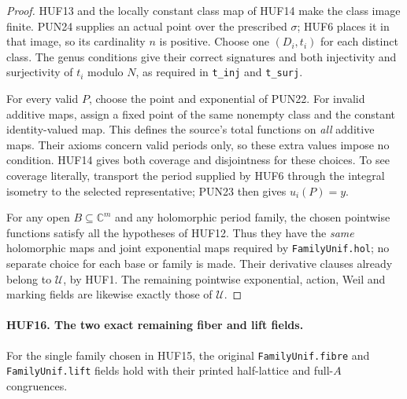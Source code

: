 \begin{proof}
HUF13 and the locally constant class map of HUF14
make the class image finite.  PUN24 supplies an
actual point over the prescribed \(\sigma\);
HUF6 places it in that image, so its cardinality
\(n\) is positive.
Choose one \((D_i,t_i)\) for each distinct class.
The genus conditions give their correct signatures
and both injectivity and surjectivity of \(t_i\)
modulo \(N\), as required in \texttt{t\_inj}
and \texttt{t\_surj}.

For every valid \(P\), choose the point and
exponential of PUN22.  For invalid additive maps,
assign a fixed point of the same nonempty class
and the constant identity-valued map.
This defines the source's total functions on
\emph{all} additive maps.  Their axioms concern
valid periods only, so these extra values impose
no condition.  HUF14 gives both coverage and
disjointness for these choices.  To see coverage
literally, transport the period supplied by HUF6
through the integral isometry to the selected
representative; PUN23 then gives \(u_i(P)=y\).

For any open \(B\subseteq\mathbb C^m\) and any
holomorphic period family, the chosen pointwise
functions satisfy all the hypotheses of HUF12.
Thus they have the \emph{same} holomorphic maps
and joint exponential maps required by
\texttt{FamilyUnif.hol}; no separate choice for
each base or family is made.  Their derivative
clauses already belong to \(\mathcal U\), by HUF1.
The remaining pointwise exponential, action,
Weil and marking fields are likewise exactly
those of \(\mathcal U\).
\end{proof}

\paragraph{HUF16. The two exact remaining fiber and lift fields.}
\label{claim:HUF16}
For the single family chosen in HUF15, the
original \texttt{FamilyUnif.fibre} and
\texttt{FamilyUnif.lift} fields hold with their
printed half-lattice and full-\(A\) congruences.

